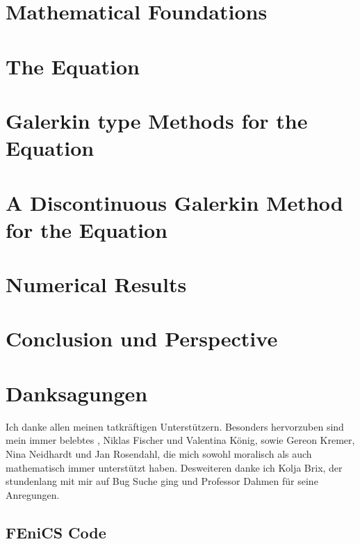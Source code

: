 \documentclass{template}
\begin{document}
\chapter{Mathematical Foundations}
\label{ch:TheoreticalBackground}



\chapter{The \MA Equation}
\label{ch:MongeAmpereEq}



\chapter{Galerkin type Methods for the \MA Equation}
\label{ch:DGMongeAmpere}


\chapter{A Discontinuous Galerkin Method for the \MA Equation}
\label{ch:ourMethod}


\chapter{Numerical Results}
\label{ch:NumericalResults}


\chapter{Conclusion und Perspective}
\label{ch:conclusion}


\chapter*{Danksagungen}
Ich danke allen meinen tatkräftigen Unterstützern. Besonders hervorzuben sind mein immer belebtes , Niklas Fischer und Valentina König, sowie Gereon Kremer, Nina Neidhardt und Jan Rosendahl, die mich sowohl moralisch als auch mathematisch immer unterstützt haben.
Desweiteren danke ich Kolja Brix, der stundenlang mit mir auf Bug Suche ging und Professor Dahmen für seine Anregungen.


\begin{appendices}
\chapter{FEniCS Code}
	
\end{appendices}



\newpage
%
\newpage


\end{document}
